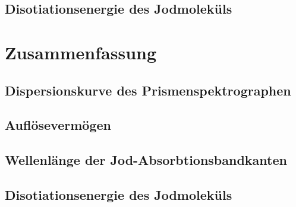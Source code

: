 \documentclass[12pt,english,ngerman]{scrartcl}
\begin{document}
\subsection{Disotiationsenergie des Jodmoleküls}


\section{Zusammenfassung}\label{sec:zs}


\subsection{Dispersionskurve des Prismenspektrographen}


\subsection{Auflösevermögen}


\subsection{Wellenlänge der Jod-Absorbtionsbandkanten}


\subsection{Disotiationsenergie des Jodmoleküls}
\end{document}
